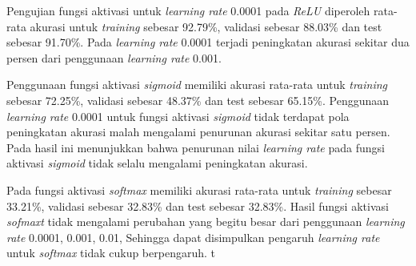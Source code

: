     Pengujian fungsi aktivasi untuk \textit{learning rate} 0.0001 
    pada \textit{ReLU} diperoleh rata-rata akurasi untuk \textit{training} sebesar 92.79\%, validasi sebesar 88.03\% dan test sebesar 91.70\%. Pada \textit{learning rate} 0.0001 terjadi peningkatan akurasi sekitar dua persen dari penggunaan \textit{learning rate} 0.001. 
    
    Penggunaan fungsi aktivasi \textit{sigmoid} memiliki akurasi rata-rata untuk \textit{training} sebesar 72.25\%, validasi sebesar 48.37\% dan test sebesar 65.15\%. Penggunaan \textit{learning rate} 0.0001 untuk fungsi aktivasi \textit{sigmoid} tidak terdapat pola peningkatan akurasi malah mengalami penurunan akurasi sekitar satu persen. Pada hasil ini menunjukkan bahwa penurunan nilai \textit{learning rate} pada fungsi aktivasi \textit{sigmoid}
    tidak selalu mengalami peningkatan akurasi. 

    Pada fungsi aktivasi \textit{softmax} memiliki akurasi rata-rata untuk \textit{training} sebesar 33.21\%, validasi sebesar 32.83\% dan test sebesar 32.83\%. Hasil fungsi aktivasi \textit{sofmaxt} tidak mengalami perubahan yang begitu besar dari penggunaan \textit{learning rate} 0.0001, 0.001, 0.01, Sehingga dapat disimpulkan pengaruh \textit{learning rate} untuk \textit{softmax }tidak cukup berpengaruh.
t


